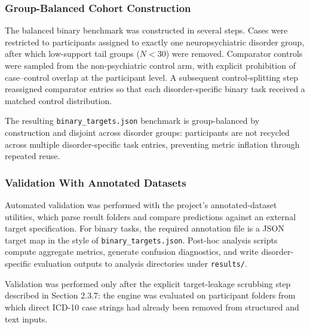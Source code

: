 \documentclass[11pt,a4paper,twoside]{article}
\begin{document}
\subsubsection{Group-Balanced Cohort Construction}
The balanced binary benchmark was constructed in several steps. Cases were restricted to participants assigned to exactly one neuropsychiatric disorder group, after which low-support tail groups ($N < 30$) were removed. Comparator controls were sampled from the non-psychiatric control arm, with explicit prohibition of case--control overlap at the participant level. A subsequent control-splitting step reassigned comparator entries so that each disorder-specific binary task received a matched control distribution.

The resulting \texttt{binary\_{\allowbreak}targets.{\allowbreak}json} benchmark is group-balanced by construction and disjoint across disorder groups: participants are not recycled across multiple disorder-specific task entries, preventing metric inflation through repeated reuse.

\subsubsection{Validation With Annotated Datasets}
Automated validation was performed with the project's annotated-dataset utilities, which parse result folders and compare predictions against an external target specification. For binary tasks, the required annotation file is a JSON target map in the style of \texttt{binary\_{\allowbreak}targets.{\allowbreak}json}. Post-hoc analysis scripts compute aggregate metrics, generate confusion diagnostics, and write disorder-specific evaluation outputs to analysis directories under \texttt{results/{\allowbreak}}.

Validation was performed only after the explicit target-leakage scrubbing step described in Section 2.3.7: the engine was evaluated on participant folders from which direct ICD-10 case strings had already been removed from structured and text inputs.
\end{document}
